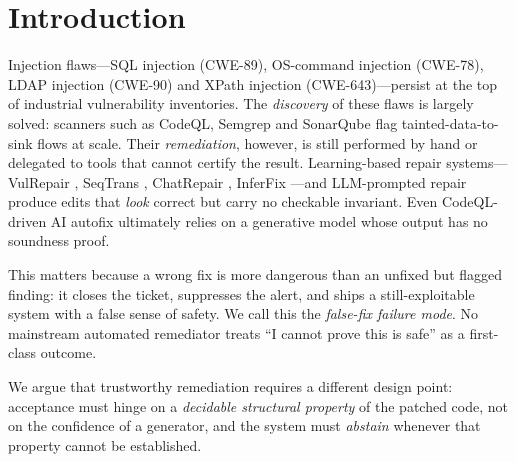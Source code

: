 \documentclass[conference]{IEEEtran}
\begin{document}
\section{Introduction}
Injection flaws---SQL injection (CWE-89), OS-command injection (CWE-78),
LDAP injection (CWE-90) and XPath injection (CWE-643)---persist at the top
of industrial vulnerability inventories. The \emph{discovery} of these
flaws is largely solved: scanners such as CodeQL, Semgrep and SonarQube
flag tainted-data-to-sink flows at scale. Their \emph{remediation},
however, is still performed by hand or delegated to tools that cannot
certify the result. Learning-based repair systems---VulRepair
\cite{fu2022vulrepair}, SeqTrans \cite{chi2023seqtrans}, ChatRepair
\cite{xia2023chatrepair}, InferFix \cite{jin2023inferfix}---and
LLM-prompted repair \cite{pearce2023examining} produce edits that
\emph{look} correct but carry no checkable invariant. Even CodeQL-driven
AI autofix \cite{anand2025codeqlautofix} ultimately relies on a generative
model whose output has no soundness proof.

This matters because a wrong fix is more dangerous than an unfixed but
flagged finding: it closes the ticket, suppresses the alert, and ships a
still-exploitable system with a false sense of safety. We call this the
\emph{false-fix failure mode}. No mainstream automated remediator treats
``I cannot prove this is safe'' as a first-class outcome.

We argue that trustworthy remediation requires a different design point:
acceptance must hinge on a \emph{decidable structural property} of the
patched code, not on the confidence of a generator, and the system must
\emph{abstain} whenever that property cannot be established.
\end{document}
